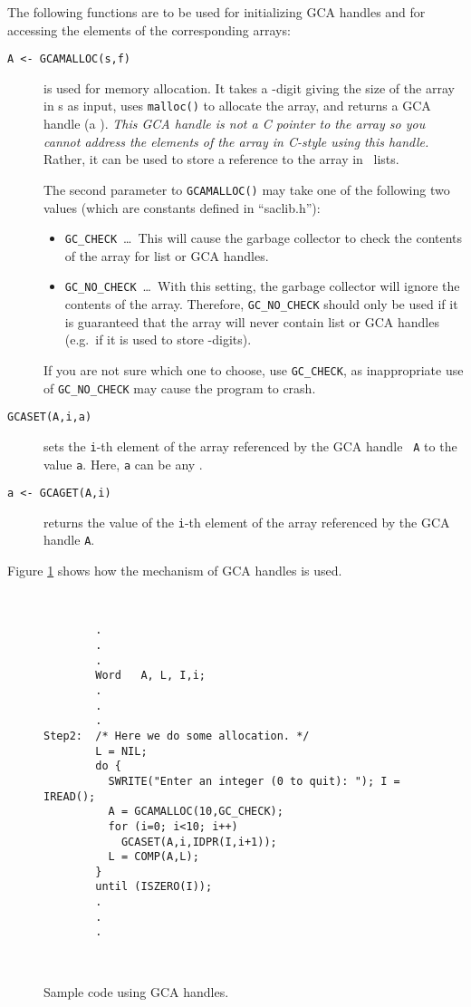 The following functions are to be used for initializing GCA handles and for
accessing the elements of the corresponding arrays:
\begin{description}
\item[{\tt A <- GCAMALLOC(s,f)}]
  is used for memory allocation. It takes a \BETA-digit giving the size of
  the array in \Word s as input, uses {\tt malloc()} to allocate the array,
  and returns a GCA handle (a \Word). {\em This GCA handle is not a C
  pointer to the array so you cannot address the elements of the array in
  C-style using this handle.} Rather, it can be used to store a reference to
  the array in \saclib\ lists.

  The second parameter to {\tt GCAMALLOC()} may take one of the following two
  values (which are constants defined in ``saclib.h''):
  \begin{itemize}
  \item {\tt GC\_CHECK}\ \ldots\
    This will cause the garbage collector to check the contents of the
    array for list or GCA handles.
  \item {\tt GC\_NO\_CHECK}\ \ldots\
    With this setting, the garbage collector will ignore the contents of
    the array. Therefore, {\tt GC\_NO\_CHECK} should only be used if it is
    guaranteed that the array will never contain list or GCA handles (e.g.\ if
    it is used to store \BETA-digits).  
  \end{itemize}
  If you are not sure which one to choose, use {\tt GC\_CHECK}, as
  inappropriate use of {\tt GC\_NO\_CHECK} may cause the program to crash.

\item[{\tt GCASET(A,i,a)}]\index{GCASET}
  sets the {\tt i}-th element of the array referenced by the GCA handle {\tt
  A} to the value {\tt a}. Here, {\tt a} can be any \Word.

\item[{\tt a <- GCAGET(A,i)}]
  returns the value of the {\tt i}-th element of the array referenced by the
  GCA handle {\tt A}.

\end{description}

Figure \ref{f:GCA1} shows how the mechanism of GCA handles is used.

\begin{figure}[htb]
\ \hrulefill\ \small
\begin{verbatim}
        .
        .
        .
        Word   A, L, I,i;
        .
        .
        .
Step2:  /* Here we do some allocation. */
        L = NIL;
        do {
          SWRITE("Enter an integer (0 to quit): "); I = IREAD();
          A = GCAMALLOC(10,GC_CHECK);
          for (i=0; i<10; i++)
            GCASET(A,i,IDPR(I,i+1));
          L = COMP(A,L);
        }
        until (ISZERO(I));
        .
        .
        .
\end{verbatim}
\ \hrulefill\ \normalsize
\caption{Sample code using GCA handles.}
\label{f:GCA1}
\end{figure}

